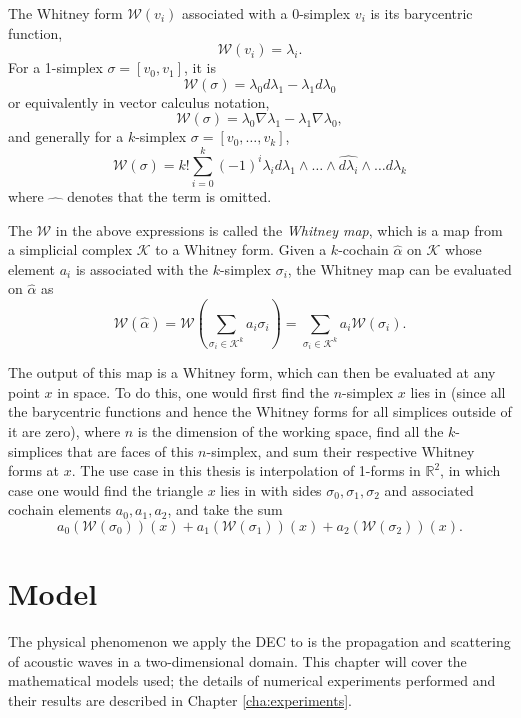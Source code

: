 \documentclass[utf8,english]{gradu3}
\begin{document}
The Whitney form $\mathcal{W}(v_i)$ associated with a 0-simplex $v_i$
is its barycentric function,
\[
  \mathcal{W}(v_i) = \lambda_i.
\]
For a 1-simplex $\sigma = [v_0,v_1]$, it is
\[
  \mathcal{W}(\sigma) = \lambda_0 d\lambda_1 - \lambda_1 d\lambda_0
\]
or equivalently in vector calculus notation,
\[
  \mathcal{W}(\sigma) = \lambda_0 \nabla\lambda_1 - \lambda_1 \nabla\lambda_0,
\]
and generally for a $k$-simplex $\sigma = [v_0,\dots,v_k]$,
\begin{equation}
  \mathcal{W}(\sigma) = k! \sum_{i=0}^{k} (-1)^i
    \lambda_i d\lambda_1 \wedge \dots \wedge \widehat{d\lambda_i}
    \wedge \dots d\lambda_k
\end{equation}
where $\widehat{\quad}$ denotes that the term is omitted.

The $\mathcal{W}$ in the above expressions is called the
\textit{Whitney map}, which is a map
from a simplicial complex $\mathcal{K}$ to a Whitney form.
Given a $k$-cochain $\widehat{\alpha}$ on $\mathcal{K}$ whose element $a_i$
is associated with the $k$-simplex $\sigma_i$,
the Whitney map can be evaluated on $\widehat{\alpha}$ as
\begin{equation}
  \mathcal{W}(\widehat{\alpha})
  = \mathcal{W}(\sum_{\sigma_i \in \mathcal{K}^k} a_i\sigma_i)
  = \sum_{\sigma_i \in \mathcal{K}^k} a_i \mathcal{W}(\sigma_i).
\end{equation}

The output of this map is a Whitney form,
which can then be evaluated at any point $x$ in space.
To do this, one would first find the $n$-simplex $x$ lies in
(since all the barycentric functions and hence the Whitney forms
for all simplices outside of it are zero),
where $n$ is the dimension of the working space,
find all the $k$-simplices that are faces of this $n$-simplex,
and sum their respective Whitney forms at $x$.
The use case in this thesis is interpolation of 1-forms in $\mathbb{R}^2$,
in which case one would find the triangle $x$ lies in
with sides $\sigma_0,\sigma_1,\sigma_2$
and associated cochain elements $a_0,a_1,a_2$,
and take the sum
\[
  a_0 (\mathcal{W}(\sigma_0))(x)
  + a_1 (\mathcal{W}(\sigma_1))(x)
  + a_2 (\mathcal{W}(\sigma_2))(x).
\]


\chapter{Model}\label{cha:model}

The physical phenomenon we apply the DEC to
is the propagation and scattering of acoustic waves
in a two-dimensional domain.
This chapter will cover the mathematical models used;
the details of numerical experiments performed and their results
are described in Chapter \ref{cha:experiments}.
\end{document}
